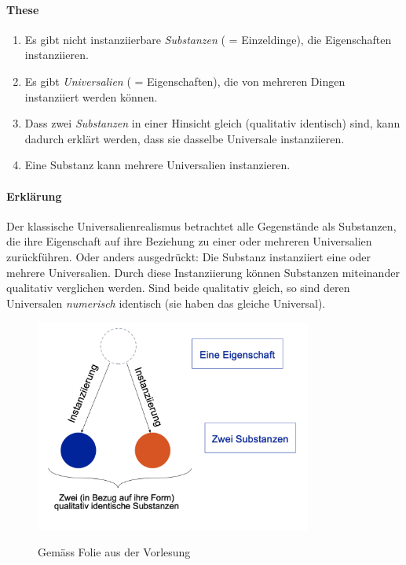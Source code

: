 \documentclass[../main.tex]{subfiles}
\begin{document}
\paragraph{These} 
\begin{enumerate}[label=(\alph*)]
	\item Es gibt nicht instanziierbare \textit{Substanzen} ( = Einzeldinge), die Eigenschaften instanziieren.
	\item Es gibt \textit{Universalien} ( = Eigenschaften), die von mehreren Dingen instanziiert werden können. 
	\item Dass zwei \textit{Substanzen} in einer Hinsicht gleich (qualitativ identisch) sind, kann dadurch erklärt werden, dass sie dasselbe Universale instanziieren. 
	\item Eine Substanz kann mehrere Universalien instanzieren.
\end{enumerate} 
\paragraph{Erklärung} Der klassische Universalienrealismus betrachtet alle Gegenstände als Substanzen, die ihre Eigenschaft auf ihre Beziehung zu einer oder mehreren Universalien zurückführen. Oder anders ausgedrückt: Die Substanz instanziiert eine oder mehrere Universalien. Durch diese Instanziierung können Substanzen miteinander qualitativ verglichen werden. Sind beide qualitativ gleich, so sind deren Universalen \textit{numerisch} identisch (sie haben das gleiche Universal).

\begin{figure}[!htb]
\centering
{\centering\includegraphics[height=7cm]{images/eine_eigenschaft_zwei_substanzen_universalienrealismus.png}\endcenter}
\caption{Gemäss Folie aus der Vorlesung}
\end{figure}
\end{document}
